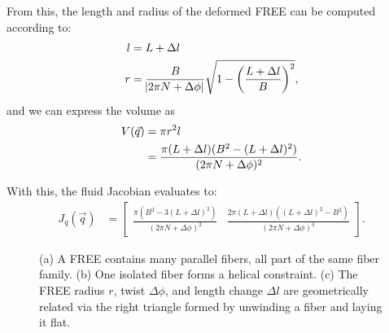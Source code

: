 From this, the length and radius of the deformed FREE can be computed according to:
\begin{align}
    l &= L + \Delta l \label{eq:l} \\
	r &= \frac{B}{\abs{2 \pi N + \Delta \phi}} \sqrt{1 - \left( \frac{L+\Delta l}{B} \right)^2}, \label{eq:r}
\end{align}
and we can express the volume as
\begin{align}
	V(\vec{q}) &= \pi r^2 l \notag \\ 
	&= \frac{\pi (L+\Delta l) (B^2 - (L+\Delta l)^2)}{(2 \pi N + \Delta \phi)^2}  \label{eq:V}.
\end{align}

With this, the fluid Jacobian evaluates to:
\begin{align}
    J_q (\vec{q})
    &= \begin{bmatrix} 
		        \frac{\pi \left( B^2 - 3(L + \Delta l)^2 \right)}{(2 \pi N + \Delta \phi)^2} & \frac{2 \pi (L+\Delta l) \left( (L+\Delta l)^2 - B^2 \right)}{(2 \pi N + \Delta \phi)^3}
		\end{bmatrix}.    \label{eq:Jv}
\end{align}


\begin{figure}
    \centering
    \caption{(a) A FREE contains many parallel fibers, all part of the same fiber family. (b) One isolated fiber forms a helical constraint. (c) The FREE radius $r$, twist $\Delta \phi$, and length change $\Delta l$ are geometrically related via the right triangle formed by unwinding a fiber and laying it flat.}
    \label{fig:fiber}
\end{figure}




